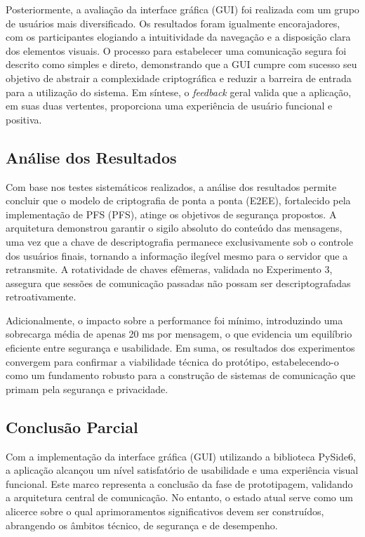 Posteriormente, a avaliação da interface gráfica (\acs{GUI}) foi realizada
com um grupo de usuários mais diversificado. Os resultados foram
igualmente encorajadores, com os participantes elogiando a
intuitividade da navegação e a disposição clara dos elementos
visuais. O processo para estabelecer uma comunicação segura foi
descrito como simples e direto, demonstrando que a \acs{GUI} cumpre com
sucesso seu objetivo de abstrair a complexidade criptográfica e
reduzir a barreira de entrada para a utilização do sistema. Em
síntese, o \textit{feedback} geral valida que a aplicação, em suas duas
vertentes, proporciona uma experiência de usuário funcional e positiva.

\subsection{Análise dos Resultados}

Com base nos testes sistemáticos realizados, a análise dos resultados
permite concluir que o modelo de criptografia de ponta a ponta
(\acs{E2EE}), fortalecido pela implementação de \acl{PFS}
(\acs{PFS}), atinge os objetivos de segurança propostos. A arquitetura
demonstrou garantir o sigilo absoluto do conteúdo das mensagens, uma
vez que a chave de descriptografia permanece exclusivamente sob o
controle dos usuários finais, tornando a informação ilegível mesmo
para o servidor que a retransmite. A rotatividade de chaves efêmeras,
validada no Experimento 3, assegura que sessões de comunicação
passadas não possam ser descriptografadas retroativamente.

Adicionalmente, o impacto sobre a performance foi mínimo,
introduzindo uma sobrecarga média de apenas 20 ms por mensagem, o que
evidencia um equilíbrio eficiente entre segurança e usabilidade. Em
suma, os resultados dos experimentos convergem para confirmar a
viabilidade técnica do protótipo, estabelecendo-o como um fundamento
robusto para a construção de sistemas de comunicação que primam pela
segurança e privacidade.

\subsection{Conclusão Parcial}

Com a implementação da interface gráfica (\acs{GUI}) utilizando a
biblioteca PySide6, a aplicação alcançou um nível satisfatório de
usabilidade e uma experiência visual funcional. Este marco representa
a conclusão da fase de prototipagem, validando a arquitetura central
de comunicação. No entanto, o estado atual serve como um alicerce
sobre o qual aprimoramentos significativos devem ser construídos,
abrangendo os âmbitos técnico, de segurança e de desempenho.

